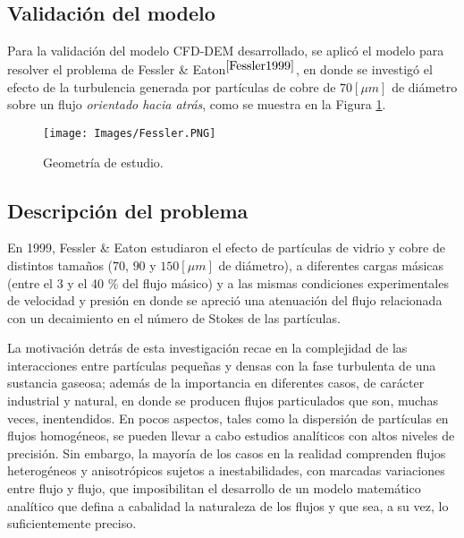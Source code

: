 \begin{center}
    \section{Validaci\'on del modelo}
\end{center}

\noindent
\justify

Para la validaci\'on del modelo CFD-DEM desarrollado, se aplic\'o el modelo para resolver el problema de Fessler \& Eaton$^{\cite{Fessler1999}}$, en donde se investig\'o el efecto de la turbulencia generada por part\'iculas de cobre de $70 [\mu m]$ de di\'ametro sobre un flujo \textit{orientado hacia atr\'as}, como se muestra en la Figura \ref{problemaVal}.

\begin{figure}[h!]
    \centering
    \texttt{[image: Images/Fessler.PNG]}
    \caption{Geometr\'ia de estudio.}
    \label{problemaVal}
\end{figure}

\subsection{Descripci\'on del problema}

\noindent
\justify

En 1999, Fessler \& Eaton estudiaron el efecto de part\'iculas de vidrio y cobre de distintos tama\~nos ($70$, $90$ y $150 [\mu m]$ de di\'ametro), a diferentes cargas m\'asicas (entre el 3 y el 40 \% del flujo m\'asico) y a las mismas condiciones experimentales de velocidad y presi\'on en donde se apreci\'o una atenuaci\'on del flujo relacionada con un decaimiento en el n\'umero de Stokes de las part\'iculas.

\noindent
\justify

La motivaci\'on detr\'as de esta investigaci\'on recae en la complejidad de las interacciones entre part\'iculas peque\~nas y densas con la fase turbulenta de una sustancia gaseosa; adem\'as de la importancia en diferentes casos, de car\'acter industrial y natural, en donde se producen flujos particulados que son, muchas veces, inentendidos. En pocos aspectos, tales como la dispersi\'on de part\'iculas en flujos homog\'eneos, se pueden llevar a cabo estudios anal\'iticos con altos niveles de precisi\'on. Sin embargo, la mayor\'ia de los casos en la realidad comprenden flujos heterog\'eneos y anisotr\'opicos sujetos a inestabilidades, con marcadas variaciones entre flujo y flujo, que imposibilitan el desarrollo de un modelo matem\'atico anal\'itico que defina a cabalidad la naturaleza de los flujos y que sea, a su vez, lo suficientemente preciso. 

